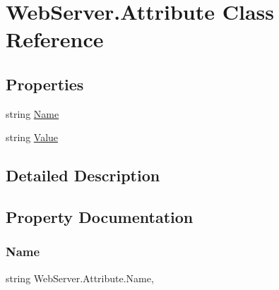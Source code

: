 \hypertarget{class_web_server_1_1_attribute}{}\section{Web\+Server.\+Attribute Class Reference}
\label{class_web_server_1_1_attribute}


 


\subsection*{Properties}
\begin{DoxyCompactItemize}
\item 
string \hyperlink{class_web_server_1_1_attribute_a25e49afca3e183b15702755d6a39f068}{Name}
\item 
string \hyperlink{class_web_server_1_1_attribute_aa6374098e87bcd66254e8cf74cebf2d5}{Value}
\end{DoxyCompactItemize}


\subsection{Detailed Description}




\subsection{Property Documentation}
\mbox{\label{class_web_server_1_1_attribute_a25e49afca3e183b15702755d6a39f068}} 
\subsubsection{\texorpdfstring{Name}{Name}}
{\footnotesize\ttfamily string Web\+Server.\+Attribute.\+Name\hspace{0.3cm}{\ttfamily [get]}, {\ttfamily [set]}}





\mbox{\label{class_web_server_1_1_attribute_aa6374098e87bcd66254e8cf74cebf2d5}} 
